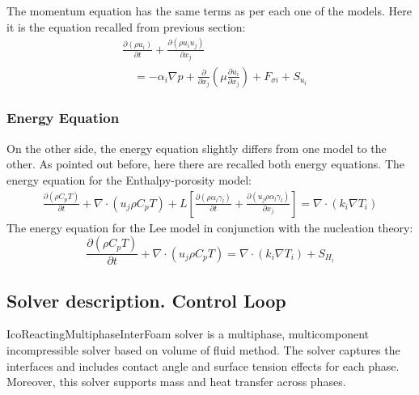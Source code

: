 \setlength{\parindent}{0.5cm} The momentum equation has the same terms as per each one of the models. Here it is the equation recalled from previous section:
\begin{equation}
	\label{3.39}
	\begin{aligned}
	&\frac{\partial\left(\rho {u}_{i}\right)}{\partial t}+\frac{\partial\left(\rho {u}_{i} {u}_{j}\right)}{\partial x_{j}} \\
	&\quad=-\alpha_{i} \nabla p+\frac{\partial}{\partial x_{j}}\left(\mu \frac{\partial {u}_{i}}{\partial x_{j}}\right)+F_{\sigma i}+S_{u_{i}}
	\end{aligned}
\end{equation}

\subsubsection{Energy Equation}

\setlength{\parindent}{0.5cm} On the other side, the energy equation slightly differs from one model to the other. As pointed out before, here there are recalled both energy equations.
The energy equation for the Enthalpy-porosity model:
\begin{equation}
\begin{aligned}
\frac{\partial (\rho C_{p} T)}{\partial t}+ \nabla \cdot\left(u_{j}\rho C_{p} T\right)+L\left[\frac{\partial (\rho \alpha_{l}\gamma_{l})}{\partial t}+ \frac{\partial (u_{j}\rho \alpha_{l}\gamma_{l})}{\partial x_{j}}\right]=\nabla \cdot\left(k_{i} \nabla T_{i}\right)
\end{aligned}
\label{3.40}
\end{equation}
The energy equation for the Lee model in conjunction with the nucleation theory:
\begin{equation}
\label{3.41}
\frac{\partial (\rho C_{p} T)}{\partial t}+\nabla \cdot\left(u_{j}\rho C_{p} T\right)=\nabla \cdot\left(k_{i} \nabla T_{i}\right)+S_{H_{i}}
\end{equation}

\subsection{Solver description. Control Loop}

\setlength{\parindent}{0.5cm} IcoReactingMultiphaseInterFoam solver is a multiphase, multicomponent incompressible solver based on volume of fluid method. The solver captures the interfaces and includes contact angle and surface tension effects for each phase. Moreover, this solver supports mass and heat transfer across phases.

